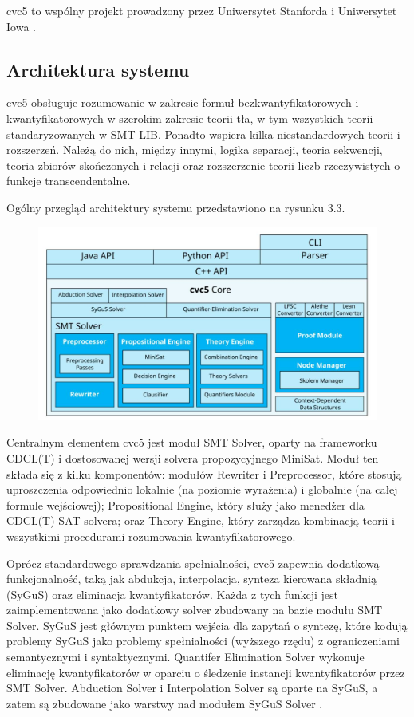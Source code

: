 cvc5 to wspólny projekt prowadzony przez Uniwersytet Stanforda i Uniwersytet Iowa \cite{BarbosaBBKLMMMN22}.

\subsection{Architektura systemu}

cvc5 obsługuje rozumowanie w zakresie formuł bezkwantyfikatorowych i kwantyfikatorowych w szerokim zakresie teorii tła, w tym wszystkich teorii standaryzowanych w SMT-LIB. Ponadto wspiera kilka niestandardowych teorii i rozszerzeń. Należą do nich, między innymi, logika separacji, teoria sekwencji, teoria zbiorów skończonych i relacji oraz rozszerzenie teorii liczb rzeczywistych o funkcje transcendentalne. 

Ogólny przegląd architektury systemu przedstawiono na rysunku 3.3.

\begin{figure}
	\centering
	\includegraphics[width=0.7\linewidth]{cvc5_architecture}
	\caption{}
	\label{fig:cvc5_architecture}
\end{figure}

Centralnym elementem cvc5 jest moduł SMT Solver, oparty na frameworku CDCL(T) \cite{NieuwenhuisOT06} i dostosowanej wersji solvera propozycyjnego MiniSat. Moduł ten składa się z kilku komponentów: modułów Rewriter i Preprocessor, które stosują uproszczenia odpowiednio lokalnie (na poziomie wyrażenia) i globalnie (na całej formule wejściowej); Propositional Engine, który służy jako menedżer dla CDCL(T) SAT solvera; oraz Theory Engine, który zarządza kombinacją teorii i wszystkimi procedurami rozumowania kwantyfikatorowego.

Oprócz standardowego sprawdzania spełnialności, cvc5 zapewnia dodatkową funkcjonalność, taką jak abdukcja, interpolacja, synteza kierowana składnią (SyGuS) oraz eliminacja kwantyfikatorów. Każda z tych funkcji jest zaimplementowana jako dodatkowy solver zbudowany na bazie modułu SMT Solver. SyGuS jest głównym punktem wejścia
dla zapytań o syntezę, które kodują problemy SyGuS jako problemy spełnialności (wyższego rzędu) z ograniczeniami semantycznymi i syntaktycznymi. Quantifer Elimination Solver wykonuje eliminację kwantyfikatorów w oparciu o śledzenie instancji kwantyfikatorów przez SMT Solver. Abduction Solver i Interpolation Solver są oparte na SyGuS, a zatem są zbudowane jako warstwy nad modułem SyGuS Solver \cite{BarbosaBBKLMMMN22}.

